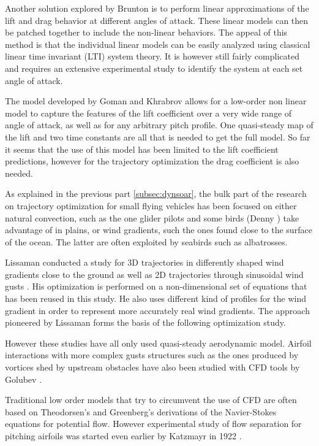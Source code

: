 \par Another solution explored by Brunton \cite{brunton2008unsteady} is to perform linear approximations of the lift and drag behavior at different angles of attack.
These linear models can then be patched together to include the non-linear behaviors.
The appeal of this method is that the individual linear models can be easily analyzed using classical linear time invariant (LTI) system theory.
It is however still fairly complicated and requires an extensive experimental study to identify the system at each set angle of attack.

\par The model developed by Goman and Khrabrov allows for a low-order non linear model to capture the features of the lift coefficient over a very wide range of angle of attack, as well as for any arbitrary pitch profile.
One quasi-steady map of the lift and two time constants are all that is needed to get the full model.
So far it seems that the use of this model has been limited to the lift coefficient predictions, however for the trajectory optimization the drag coefficient is also needed.


\par As explained in the previous part \ref{subsec:dynsoar}, the bulk part of the research on trajectory optimization for small flying vehicles has been focused on either natural convection, such as the one glider pilots and some birds (Denny \cite{denny2009dynamic}) take advantage of in plains, or wind gradients, such the ones found close to the surface of the ocean.
The latter are often exploited by seabirds such as albatrosses.

\par Lissaman conducted a study for 3D trajectories in differently shaped wind gradients close to the ground \cite{lissaman2005wind} as well as 2D trajectories through sinusoidal wind gusts \cite{Lissaman2007neutral}. 
His optimization is performed on a non-dimensional set of equations \cite{chakrabarty2010flight} that has been reused in this study.
He also uses different kind of profiles for the wind gradient in order to represent more accurately real wind gradients.
The approach pioneered by Lissaman forms the basis of the following optimization study.

\par However these studies have all only used quasi-steady aerodynamic model.
Airfoil interactions with more complex gusts structures such as the ones produced by vortices shed by upstream obstacles have also been studied with CFD tools by Golubev \cite{golubev2010high} \cite{golubev2010parametric}.

\par Traditional low order models that try to circumvent the use of CFD are often based on Theodorsen's \cite{theodorsen} and Greenberg's \cite{green} derivations of the Navier-Stokes equations for potential flow.
However experimental study of flow separation for pitching airfoils was started even earlier by Katzmayr in 1922 \cite{katz}.
